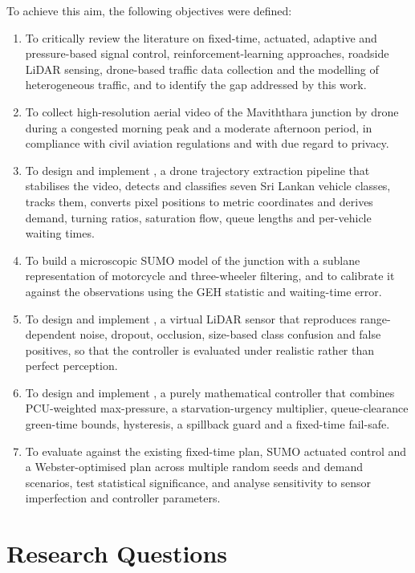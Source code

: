 To achieve this aim, the following objectives were defined:
\begin{enumerate}[label=\textbf{O\arabic*}, leftmargin=*, itemsep=2pt]
  \item To critically review the literature on fixed-time, actuated, adaptive and pressure-based signal control, reinforcement-learning approaches, roadside LiDAR sensing, drone-based traffic data collection and the modelling of heterogeneous traffic, and to identify the gap addressed by this work.
  \item To collect high-resolution aerial video of the Maviththara junction by drone during a congested morning peak and a moderate afternoon period, in compliance with civil aviation regulations and with due regard to privacy.
  \item To design and implement \dtx{}, a drone trajectory extraction pipeline that stabilises the video, detects and classifies seven Sri Lankan vehicle classes, tracks them, converts pixel positions to metric coordinates and derives demand, turning ratios, saturation flow, queue lengths and per-vehicle waiting times.
  \item To build a microscopic SUMO model of the junction with a sublane representation of motorcycle and three-wheeler filtering, and to calibrate it against the \dtx{} observations using the GEH statistic and waiting-time error.
  \item To design and implement \vls{}, a virtual LiDAR sensor that reproduces range-dependent noise, dropout, occlusion, size-based class confusion and false positives, so that the controller is evaluated under realistic rather than perfect perception.
  \item To design and implement \prism{}, a purely mathematical controller that combines PCU-weighted max-pressure, a starvation-urgency multiplier, queue-clearance green-time bounds, hysteresis, a spillback guard and a fixed-time fail-safe.
  \item To evaluate \prism{} against the existing fixed-time plan, SUMO actuated control and a Webster-optimised plan across multiple random seeds and demand scenarios, test statistical significance, and analyse sensitivity to sensor imperfection and controller parameters.
\end{enumerate}

\section{Research Questions}\label{sec:intro-rq}

